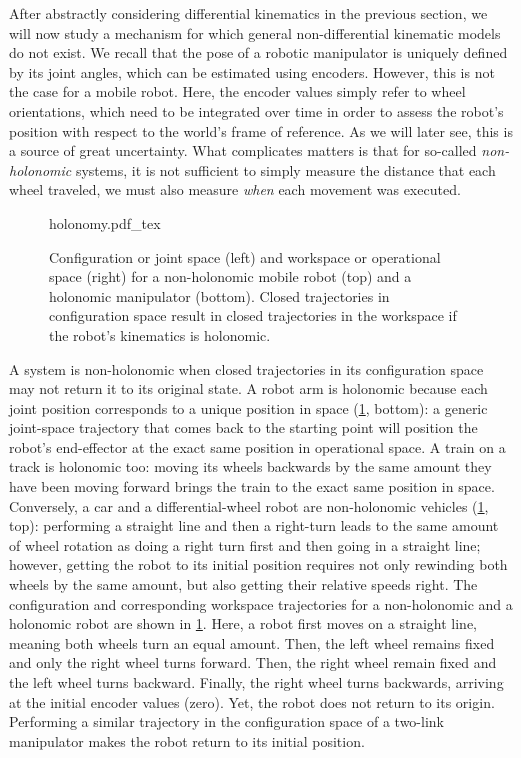 After abstractly considering differential kinematics in the previous section, we will now study a mechanism for which general non-differential kinematic models do not exist. We recall that the pose of a robotic manipulator is uniquely defined by its joint angles, which can be estimated using encoders.
However, this is not the case for a mobile robot.
Here, the encoder values simply refer to wheel orientations, which need to be integrated over time in order to assess the robot's position with respect to the world's frame of reference. As we will later see, this is a source of great uncertainty.
What complicates matters is that for so-called \textsl{non-holonomic} systems, it is not sufficient to simply measure the distance that each wheel traveled, we must also measure \textsl{when} each movement was executed.

\begin{figure}[!t]
    \small
    \centering
    \def\svgwidth{\textwidth}
    {holonomy.pdf_tex}
    \caption{Configuration or joint space (left) and workspace or operational space (right) for a non-holonomic mobile robot (top) and a holonomic manipulator (bottom). Closed trajectories in configuration space result in closed trajectories in the workspace if the robot's kinematics is holonomic.}
    \label{fig:holonomy}
\end{figure}

A system is non-holonomic when closed trajectories in its configuration space may not return it to its original state.
A robot arm is holonomic because each joint position corresponds to a unique position in space (\cref{fig:holonomy}, bottom):
a generic joint-space trajectory that comes back to the starting point will position the robot's end-effector at the exact same position in operational space.
A train on a track is holonomic too: moving its wheels backwards by the same amount they have been moving forward brings the train to the exact same position in space.
Conversely, a car and a differential-wheel robot are non-holonomic vehicles (\cref{fig:holonomy}, top): performing a straight line and then a right-turn leads to the same amount of wheel rotation as doing a right turn first and then going in a straight line; however, getting the robot to its initial position requires not only rewinding both wheels by the same amount, but also getting their relative speeds right.
The configuration and corresponding workspace trajectories for a non-holonomic and a holonomic robot are shown in \cref{fig:holonomy}.
Here, a robot first moves on a straight line, meaning both wheels turn an equal amount.
Then, the left wheel remains fixed and only the right wheel turns forward.
Then, the right wheel remain fixed and the left wheel turns backward.
Finally, the right wheel turns backwards, arriving at the initial encoder values (zero).
Yet, the robot does not return to its origin. Performing a similar trajectory in the configuration space of a two-link manipulator makes the robot return to its initial position.

